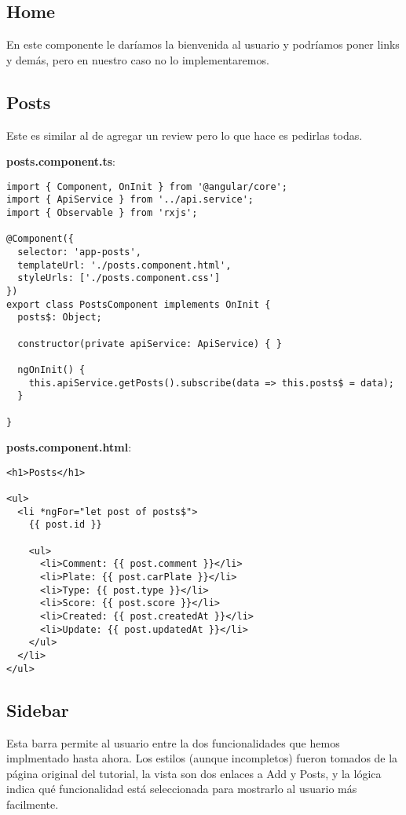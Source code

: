 \documentclass{article}
\begin{document}
\subsection{Home}
En este componente le dar\'iamos la bienvenida al usuario y podr\'iamos poner links y dem\'as, pero en nuestro caso no lo implementaremos.

\subsection{Posts}
Este es similar al de agregar un review pero lo que hace es pedirlas todas. 

\vspace{0.5cm}
\textbf{posts.component.ts}:
\begin{verbatim}
import { Component, OnInit } from '@angular/core';
import { ApiService } from '../api.service';
import { Observable } from 'rxjs';

@Component({
  selector: 'app-posts',
  templateUrl: './posts.component.html',
  styleUrls: ['./posts.component.css']
})
export class PostsComponent implements OnInit {
  posts$: Object;

  constructor(private apiService: ApiService) { }

  ngOnInit() {
    this.apiService.getPosts().subscribe(data => this.posts$ = data);
  }

}
\end{verbatim}

\vspace{0.5cm}
\textbf{posts.component.html}:
\begin{verbatim}
<h1>Posts</h1>

<ul>
  <li *ngFor="let post of posts$">
    {{ post.id }}

    <ul>
      <li>Comment: {{ post.comment }}</li>
      <li>Plate: {{ post.carPlate }}</li>
      <li>Type: {{ post.type }}</li>
      <li>Score: {{ post.score }}</li>
      <li>Created: {{ post.createdAt }}</li>
      <li>Update: {{ post.updatedAt }}</li>
    </ul>
  </li>
</ul>
\end{verbatim}

\subsection{Sidebar}
Esta barra permite al usuario entre la dos funcionalidades que hemos implmentado hasta ahora. Los estilos (aunque incompletos) fueron tomados de la p\'agina original del tutorial, la vista son dos enlaces a Add y Posts, y la l\'ogica indica qu\'e funcionalidad est\'a seleccionada para mostrarlo al usuario m\'as facilmente.
\end{document}
